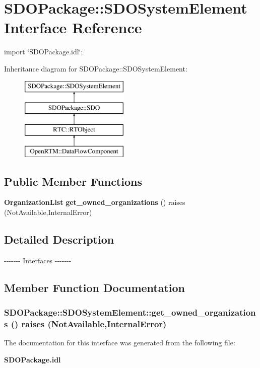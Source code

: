 \section{SDOPackage::SDOSystemElement Interface Reference}
\label{interfaceSDOPackage_1_1SDOSystemElement}


{\ttfamily import \char`\"{}SDOPackage.idl\char`\"{};}

Inheritance diagram for SDOPackage::SDOSystemElement:\begin{figure}[H]
\begin{center}
\leavevmode
\includegraphics[height=4cm]{interfaceSDOPackage_1_1SDOSystemElement}
\end{center}
\end{figure}
\subsection*{Public Member Functions}
\begin{DoxyCompactItemize}
\item 
{\bf OrganizationList} {\bf get\_\-owned\_\-organizations} ()  raises (NotAvailable,InternalError)
\end{DoxyCompactItemize}


\subsection{Detailed Description}
-\/-\/-\/-\/-\/-\/-\/ Interfaces -\/-\/-\/-\/-\/-\/-\/ 

\subsection{Member Function Documentation}
\subsubsection[{get\_\-owned\_\-organizations}]{ SDOPackage::SDOSystemElement::get\_\-owned\_\-organizations ()  raises (NotAvailable,InternalError)}\label{interfaceSDOPackage_1_1SDOSystemElement_a81238047c5dfa47d2cf3ebce1b78b240}


The documentation for this interface was generated from the following file:\begin{DoxyCompactItemize}
\item 
{\bf SDOPackage.idl}\end{DoxyCompactItemize}
